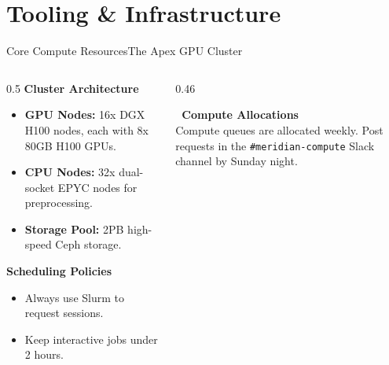 \section{Tooling \& Infrastructure}

\begin{frame}{Core Compute Resources}{The Apex GPU Cluster}
  \begin{columns}[T]
    \begin{column}{0.5\textwidth}
      \textbf{Cluster Architecture}
      \begin{itemize}
        \item \textbf{GPU Nodes:} 16x DGX H100 nodes, each with 8x 80GB H100 GPUs.
        \item \textbf{CPU Nodes:} 32x dual-socket EPYC nodes for preprocessing.
        \item \textbf{Storage Pool:} 2PB high-speed Ceph storage.
      \end{itemize}
      
      \vspace{0.3cm}
      \textbf{Scheduling Policies}
      \begin{itemize}
        \item Always use Slurm to request sessions.
        \item Keep interactive jobs under 2 hours.
      \end{itemize}
    \end{column}
    
    \begin{column}{0.46\textwidth}
      \begin{highlightbox}
        \textbf{\faServer\ Compute Allocations} \\
        Compute queues are allocated weekly. Post requests in the \texttt{\#meridian-compute} Slack channel by Sunday night.
      \end{highlightbox}
      
      \vspace{0.2cm}
      \begin{center}
      \end{center}
    \end{column}
  \end{columns}
\end{frame}

